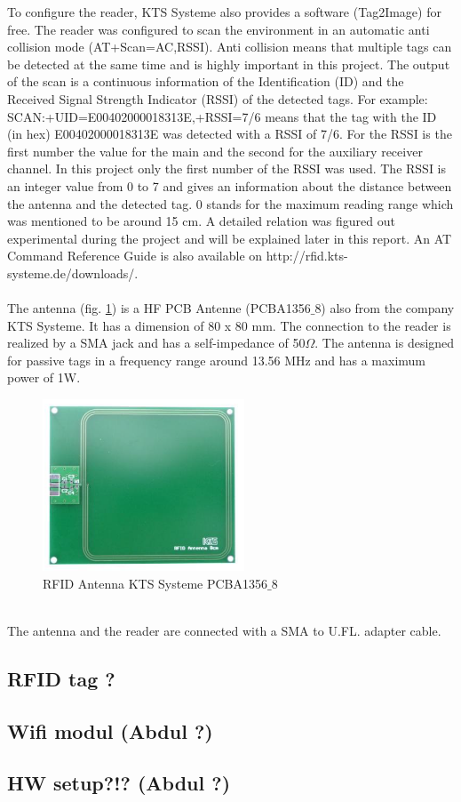 To configure the reader, KTS Systeme also provides a software (Tag2Image) for free. The reader was configured to scan the environment in an automatic anti collision mode (AT+Scan=AC,RSSI). Anti collision means that multiple tags can be detected at the same time and is highly important in this project. The output of the scan is a continuous information of the Identification (ID) and the Received Signal Strength Indicator (RSSI) of the detected tags. For example: SCAN:+UID=E00402000018313E,+RSSI=7/6 means that the tag with the ID (in hex) E00402000018313E was detected with a RSSI of 7/6. For the RSSI is the first number the value for the main and the second for the auxiliary receiver channel. In this project only the first number of the RSSI was used. The RSSI is an integer value from 0 to 7 and gives an information about the distance between the antenna and the detected tag. 0 stands for the maximum reading range which was mentioned to be around 15 cm. A detailed relation was figured out experimental during the project and will be explained later in this report. An AT Command Reference Guide is also available on http://rfid.kts-systeme.de/downloads/.\\
\\
The antenna (fig. \ref{Antenna}) is a HF PCB Antenne (PCBA1356$\_$8) also from the company KTS Systeme. It has a dimension of 80 x 80 mm. The connection to the reader is realized by a SMA jack and has a self-impedance of 50$\Omega$. The antenna is designed for passive tags in a frequency range around 13.56 MHz and has a maximum power of 1W. \\
\begin{figure}[!htbp]
\centering
\includegraphics[width = 6cm]{Pictures/Antenna}
\caption{RFID Antenna KTS Systeme PCBA1356$\_$8}
\label{Antenna}
\end{figure}\\
The antenna and the reader are connected with a SMA to U.FL. adapter cable.\\

\subsection{RFID tag ?}

\subsection{Wifi modul (Abdul ?)}

\subsection{HW setup?!? (Abdul ?)}\label{Sec_Har_Set}